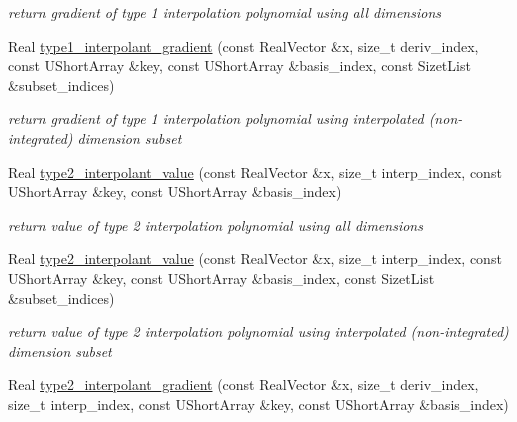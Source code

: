 \begin{DoxyCompactItemize}
\begin{DoxyCompactList}\small\item\em return gradient of type 1 interpolation polynomial using all dimensions \end{DoxyCompactList}\item 
Real \hyperlink{classPecos_1_1SharedInterpPolyApproxData_ad635c37b41cb66f1d144acf6f12b465b}{type1\+\_\+interpolant\+\_\+gradient} (const Real\+Vector \&x, size\+\_\+t deriv\+\_\+index, const U\+Short\+Array \&key, const U\+Short\+Array \&basis\+\_\+index, const Sizet\+List \&subset\+\_\+indices)
\begin{DoxyCompactList}\small\item\em return gradient of type 1 interpolation polynomial using interpolated (non-\/integrated) dimension subset \end{DoxyCompactList}\item 
Real \hyperlink{classPecos_1_1SharedInterpPolyApproxData_a4a2b43a73d46e796feaadc52736c7eac}{type2\+\_\+interpolant\+\_\+value} (const Real\+Vector \&x, size\+\_\+t interp\+\_\+index, const U\+Short\+Array \&key, const U\+Short\+Array \&basis\+\_\+index)\label{classPecos_1_1SharedInterpPolyApproxData_a4a2b43a73d46e796feaadc52736c7eac}

\begin{DoxyCompactList}\small\item\em return value of type 2 interpolation polynomial using all dimensions \end{DoxyCompactList}\item 
Real \hyperlink{classPecos_1_1SharedInterpPolyApproxData_a16b8f3feb73a786a5974455be56703a1}{type2\+\_\+interpolant\+\_\+value} (const Real\+Vector \&x, size\+\_\+t interp\+\_\+index, const U\+Short\+Array \&key, const U\+Short\+Array \&basis\+\_\+index, const Sizet\+List \&subset\+\_\+indices)
\begin{DoxyCompactList}\small\item\em return value of type 2 interpolation polynomial using interpolated (non-\/integrated) dimension subset \end{DoxyCompactList}\item 
Real \hyperlink{classPecos_1_1SharedInterpPolyApproxData_ab80fd304a277fc389fadcde453c815ff}{type2\+\_\+interpolant\+\_\+gradient} (const Real\+Vector \&x, size\+\_\+t deriv\+\_\+index, size\+\_\+t interp\+\_\+index, const U\+Short\+Array \&key, const U\+Short\+Array \&basis\+\_\+index)\label{classPecos_1_1SharedInterpPolyApproxData_ab80fd304a277fc389fadcde453c815ff}


\end{DoxyCompactItemize}
